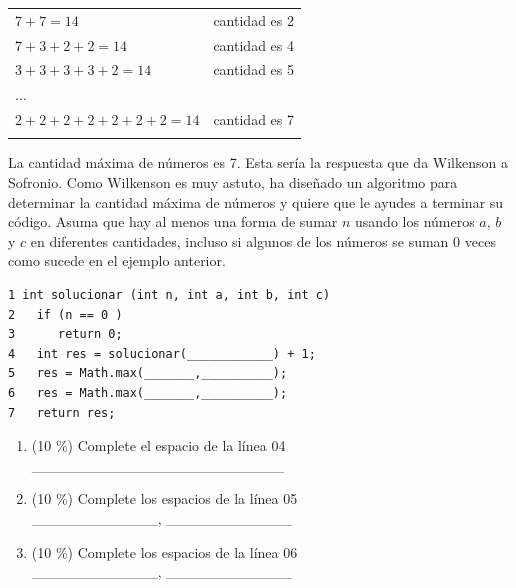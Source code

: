 \documentclass[twocolumn]{article}
\begin{document}
\begin{tabular}{l l}
$7 + 7 = 14$  &                  cantidad es 2 \\
$7 + 3 + 2 + 2 = 14$ &          cantidad es 4 \\
$3 + 3 + 3 + 3 + 2 = 14$  &  cantidad es 5 \\
$\dots$ & \\
$2 + 2 + 2 + 2 + 2 + 2 + 2 = 14$ & cantidad es 7 \\\\
\end{tabular}

La cantidad máxima de números es 7. Esta sería la respuesta que da Wilkenson a Sofronio. 
Como Wilkenson es muy astuto, ha diseñado un algoritmo para determinar la cantidad máxima de números y quiere que le ayudes a terminar su código. Asuma que hay al menos una forma de sumar $n$ usando los números $a$, $b$ y $c$ en diferentes cantidades, incluso
si algunos de los números se suman $0$ veces como sucede en el ejemplo anterior.

{\small
\begin{verbatim}
1 int solucionar (int n, int a, int b, int c) 
2   if (n == 0 )
3      return 0;
4   int res = solucionar(____________) + 1;
5   res = Math.max(_______,__________);  
6   res = Math.max(_______,__________);
7   return res;
\end{verbatim}
}

\begin{enumerate}[label=\Alph*]


	\item (10 \%) Complete el espacio de la línea 04\\

	\_\_\_\_\_\_\_\_\_\_\_\_\_\_\_\_\_\_\_\_\_\_\_\_

	\item (10 \%) Complete los espacios de la línea 05\\

	\_\_\_\_\_\_\_\_\_\_\_\_, \_\_\_\_\_\_\_\_\_\_\_\_

	\item (10 \%) Complete los espacios de la línea 06	\\

	\_\_\_\_\_\_\_\_\_\_\_\_, \_\_\_\_\_\_\_\_\_\_\_\_
\end{enumerate} 


\end{document}
